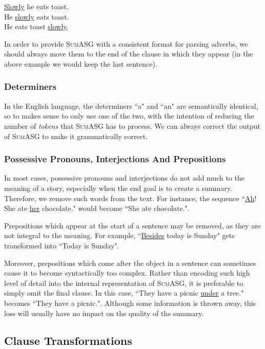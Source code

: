 \begin{displayquote}
\underline{Slowly} he eats toast. \\
He \underline{slowly} eats toast. \\
He eats toast \underline{slowly}.
\end{displayquote}

In order to provide \textsc{SumASG} with a consistent format for parsing adverbs, we should always move them to the end of the clause in which they appear (in the above example we would keep the last sentence).


\subsubsection{Determiners}

In the English language, the determiners ``a" and ``an" are semantically identical, so to makes sense to only use one of the two, with the intention of reducing the number of \textit{tokens} that \textsc{SumASG} has to process. We can always correct the output of \textsc{SumASG} to make it grammatically correct.

\subsubsection{Possessive Pronouns, Interjections And Prepositions}

In most cases, possessive pronouns and interjections do not add much to the meaning of a story, especially when the end goal is to create a summary. Therefore, we remove such words from the text. For instance, the sequence ``\underline{Ah}! She ate \underline{her} chocolate." would become ``She ate chocolate.".

Prepositions which appear at the start of a sentence may be removed, as they are not integral to the meaning. For example, ``\underline{Besides} today is Sunday" gets transformed into ``Today is Sunday".

Moreover, prepositions which come after the object in a sentence can sometimes cause it to become syntactically too complex. Rather than encoding such high level of detail into the internal representation of \textsc{SumASG}, it is preferable to simply omit the final clause. In this case, ``They have a picnic \underline{under} a tree." becomes ``They have a picnic.". Although some information is thrown away, this loss will usually have no impact on the quality of the summary.

\subsection{Clause Transformations}

